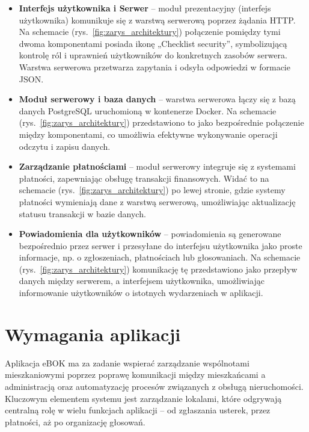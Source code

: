 \begin{itemize}

	\item \textbf{Interfejs użytkownika i Serwer} – moduł prezentacyjny (interfejs użytkownika) komunikuje się z warstwą serwerową poprzez żądania HTTP. Na schemacie (rys.~\ref{fig:zarys_architektury}) połączenie pomiędzy tymi dwoma komponentami posiada ikonę „Checklist security”, symbolizującą kontrolę ról i uprawnień użytkowników do konkretnych zasobów serwera. Warstwa serwerowa przetwarza zapytania i odsyła odpowiedzi w formacie JSON.

	\item \textbf{Moduł serwerowy i baza danych} – warstwa serwerowa łączy się z bazą danych PostgreSQL uruchomioną w kontenerze Docker. Na schemacie (rys.~\ref{fig:zarys_architektury}) przedstawiono to jako bezpośrednie połączenie między komponentami, co umożliwia efektywne wykonywanie operacji odczytu i zapisu danych.

	\item \textbf{Zarządzanie płatnościami} – moduł serwerowy integruje się z systemami płatności, zapewniając obsługę transakcji finansowych. Widać to na schemacie (rys.~\ref{fig:zarys_architektury}) po lewej stronie, gdzie systemy płatności wymieniają dane z warstwą serwerową, umożliwiając aktualizację statusu transakcji w bazie danych.

	\item \textbf{Powiadomienia dla użytkowników} – powiadomienia są generowane bezpośrednio przez serwer i przesyłane do interfejsu użytkownika jako proste informacje, np. o zgłoszeniach, płatnościach lub głosowaniach. Na schemacie (rys.~\ref{fig:zarys_architektury}) komunikację tę przedstawiono jako przepływ danych między serwerem, a interfejsem użytkownika, umożliwiając informowanie użytkowników o istotnych wydarzeniach w aplikacji.

	
\end{itemize}


\section{Wymagania aplikacji} %

Aplikacja eBOK ma za zadanie wspierać zarządzanie wspólnotami mieszkaniowymi poprzez poprawę komunikacji między mieszkańcami a administracją oraz automatyzację procesów związanych z obsługą nieruchomości. Kluczowym elementem systemu jest zarządzanie lokalami, które odgrywają centralną rolę w wielu funkcjach aplikacji – od zgłaszania usterek, przez płatności, aż po organizację głosowań.

